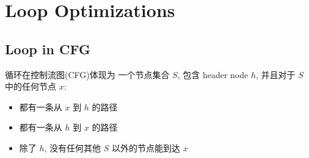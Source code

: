 \section{Loop Optimizations}
\subsection{Loop in CFG}
循环在控制流图(CFG)体现为 一个节点集合 $S$, 包含 header node $h$, 并且对于 $S$ 中的任何节点 $x$:
\begin{itemize}
    \item 都有一条从 $x$ 到 $h$ 的路径
    \item 都有一条从 $h$ 到 $x$ 的路径
    \item 除了 $h$, 没有任何其他 $S$ 以外的节点能到达 $x$
\end{itemize}

